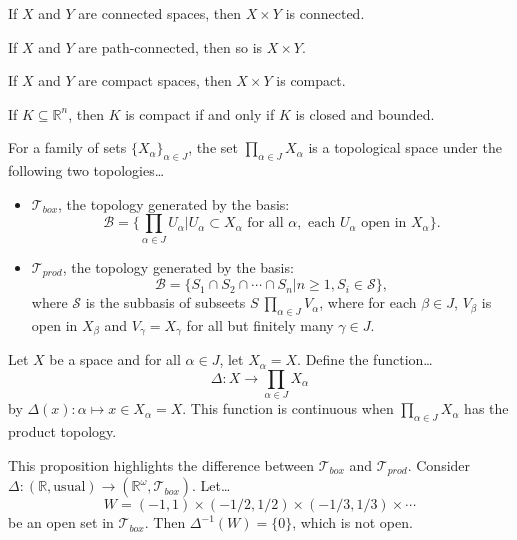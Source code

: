 \begin{proposition}
If $X$ and $Y$ are connected spaces, then $X \times Y$ is connected.
\end{proposition}

\begin{proposition}
If $X$ and $Y$ are path-connected, then so is $X \times Y$.
\end{proposition}

\begin{proposition}
If $X$ and $Y$ are compact spaces, then $X \times Y$ is compact.
\end{proposition}

\begin{corollary}
If $K \subseteq \mathbb{R}^n$, then $K$ is compact if and only if $K$ is closed and bounded.
\end{corollary}

\label{infiniteproducttopology}
For a family of sets $\{X_{\alpha}\}_{\alpha \in J}$, the set $\prod_{\alpha \in J} X_{\alpha}$ is a topological space under the following two topologies\dots
\begin{itemize}
  \item $\mathcal{T}_{box}$, the topology generated by the basis:
  $$\mathcal{B} = \{ \prod_{\alpha \in J} U_{\alpha} | U_{\alpha} \subset X_{\alpha} \textrm{ for all } \alpha, \textrm{ each } U_{\alpha} \textrm{ open in } X_{\alpha} \}.$$
  \item $\mathcal{T}_{prod}$, the topology generated by the basis:
  $$\mathcal{B} = \{ S_1 \cap S_2 \cap \cdots \cap S_n | n \geq 1, S_i \in \mathcal{S}\},$$
  where $\mathcal{S}$ is the subbasis of subseets $S \ \prod_{\alpha \in J} V_{\alpha}$, where for each $\beta \in J$, $V_{\beta}$ is open in $X_{\beta}$ and $V_{\gamma} = X_{\gamma}$
  for all but finitely many $\gamma \in J$.
\end{itemize}

\begin{proposition}
Let $X$ be a space and for all $\alpha \in J$, let $X_{\alpha} = X$. Define the function\dots
$$\Delta : X \rightarrow \prod_{\alpha \in J} X_{\alpha}$$
by $\Delta(x) : \alpha \mapsto x \in X_{\alpha} = X$. This function is continuous when $\prod_{\alpha \in J} X_{\alpha}$ has the product topology.
\end{proposition}

\noindent This proposition highlights the difference between $\mathcal{T}_{box}$ and $\mathcal{T}_{prod}$. Consider $\Delta : (\mathbb{R}, \textrm{usual}) \rightarrow (\mathbb{R}^{\omega}, \mathcal{T}_{box}).$
Let\dots
$$W = (-1,1) \times (-1/2,1/2) \times (-1/3, 1/3) \times \cdots$$
be an open set in $\mathcal{T}_{box}$. Then $\Delta^{-1}(W) = \{ 0 \}$, which is not open.

